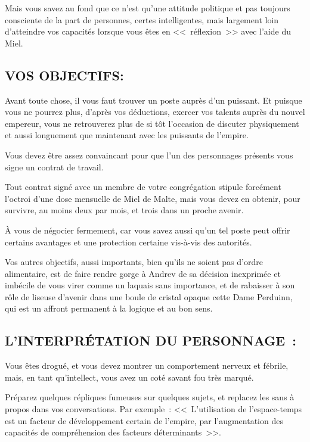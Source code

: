 \documentclass[14pt,twocolumn]{extarticle}
\begin{document}
Mais vous savez au fond que ce n'est qu'une attitude politique et pas toujours
consciente de la part de personnes, certes intelligentes, mais largement loin
d'atteindre vos capacités lorsque vous êtes en <<~réflexion~>> avec l'aide du
Miel.

\subsection{VOS OBJECTIFS:}

Avant toute chose, il vous faut trouver un poste auprès d'un puissant. Et
puisque vous ne pourrez plus, d'après vos déductions, exercer vos talents
auprès du nouvel empereur, vous ne retrouverez plus de si tôt l'occasion de
discuter physiquement et aussi longuement que maintenant avec les puissants de
l'empire.

Vous devez être assez convaincant pour que l'un des personnages présents vous
signe un contrat de travail.

Tout contrat signé avec un membre de votre congrégation stipule forcément
l'octroi d'une dose mensuelle de Miel de Malte, mais vous devez en obtenir,
pour survivre, au moins deux par mois, et trois dans un proche avenir.

À vous de négocier fermement, car vous savez aussi qu'un tel poste peut offrir
certains avantages et une protection certaine vis-à-vis des autorités.

Vos autres objectifs, aussi importants, bien qu'ils ne soient pas d'ordre
alimentaire, est de faire rendre gorge à Andrev de sa décision inexprimée et
imbécile de vous virer comme un laquais sans importance, et de rabaisser à son
rôle de liseuse d'avenir dans une boule de cristal opaque cette Dame Perduinn,
qui est un affront permanent à la logique et au bon sens.

\subsection{L'INTERPRÉTATION DU PERSONNAGE~:}

Vous êtes drogué, et vous devez montrer un comportement nerveux et fébrile,
mais, en tant qu'intellect, vous avez un coté savant fou très marqué.

Préparez quelques répliques fumeuses sur quelques sujets, et replacez les sans
à propos dans vos conversations. Par exemple~: <<~L'utilisation de
l'espace-temps est un facteur de développement certain de l'empire, par
l'augmentation des capacités de compréhension des facteurs déterminants~>>.
\end{document}
